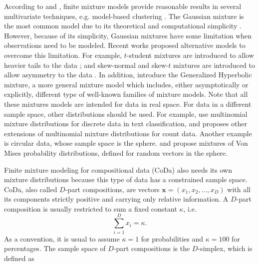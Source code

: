 \documentclass[10pt, a4paper]{article}
\begin{document}
According to \cite{scott1971clustering} and \cite{mclachlan2004finite}, finite mixture models provide reasonable results in several multivariate techniques, e.g. model-based clustering  \citep{banfield1993model,  fraley2002model}. The Gaussian mixture is the most common model 
due to its theoretical and computational simplicity \citep{mclachlan2004finite}. 
However, because of its simplicity, Gaussian mixtures have some limitation when observations need to be modeled.
%
%
%
Recent works  proposed alternative models to overcome this limitation. For example, $t$-student mixtures are introduced to allow heavier tails to the data \citep{andrews2012model, lee2013finite, lin2010robust}; and skew-normal and skew-$t$ mixtures are introduced to allow asymmetry to the data \citep{lee2011fitting}. In addition, \cite{browne2013mixture} introduce the Generalized Hyperbolic mixture, a more general mixture model which includes, either asymptotically or explicitly, different type of well-known families of mixture models. Note that all these mixtures models are intended for data in real space. For data in a different sample space, other distributions should be used. 
For example, \cite{bickel2004multi} use multinomial mixture distributions for discrete data in text classification, and  
 \cite[][]{bouguila2011count} proposes other extensions of multinomial mixture distributions for count data. 
Another example is circular data, whose sample space is the sphere.  \cite{banerjee2005clustering} and \cite{mardia2007protein} propose mixtures of Von Mises probability distributions, defined for random vectors in the sphere.

Finite mixture modeling for compositional data (CoDa) also needs its own mixture distributions because this type of data has a constrained sample space.
CoDa, also called $D$-part compositions, are vectors $\textbf{x} = (x_1, x_2, ..., x_D)$ with all its components strictly positive  and carrying only relative information. A $D$-part composition is usually restricted to sum a fixed constant $\kappa$, i.e.
\begin{equation}
\sum_{i=1 }^D x_i = \kappa.
\label{sum_to_constant}
\end{equation}
As a convention, it is usual to assume $\kappa =1$ for probabilities and $\kappa = 100$ for percentages. The sample space of $D$-part compositions is the $D$-simplex, which is defined as
\end{document}
